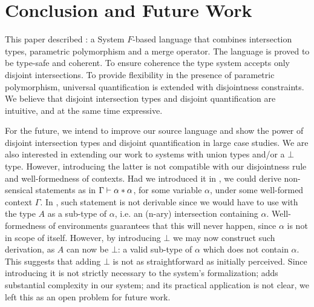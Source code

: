 \section{Conclusion and Future Work}
\label{sec:conclusion}


This paper described \name: a System $F$-based language that combines
intersection types, parametric polymorphism and a merge operator.
The language is proved to be type-safe and coherent.
To ensure coherence the type system accepts only
disjoint intersections. To provide flexibility in the presence of parametric polymorphism,
universal quantification is extended with
disjointness constraints. We believe that disjoint intersection types
and disjoint quantification are intuitive, and at the same time
expressive.


For the future, we intend to improve our source language
and show the power of disjoint intersection types and disjoint
quantification in large case studies.
We are also interested in extending our work to systems with union types and/or 
a $\bot$ type. 
However, introducing the latter is not compatible with our disjointness rule
 and well-formedness of contexts.
Had we introduced it in \name, we could derive non-sensical statements as in 
$\Gamma \vdash \alpha * \alpha$, for some variable $\alpha$, under some well-formed context $\Gamma$.
In \name, such statement is not derivable since we would have to use  with the 
type $A$ as a sub-type of $\alpha$, i.e. an (n-ary) intersection containing $\alpha$.
Well-formedness of environments guarantees that this will never happen, since $\alpha$ is not in
scope of itself. 
However, by introducing $\bot$ we may now construct such derivation, as $A$ can now be $\bot$: a valid
sub-type of $\alpha$ which does not contain $\alpha$.
This suggests that adding $\bot$ is not as straightforward as initially perceived.
Since introducing it is not strictly necessary to the system's formalization; adds 
substantial complexity in our system; and its practical application is not clear, we left this
as an open problem for future work. 

